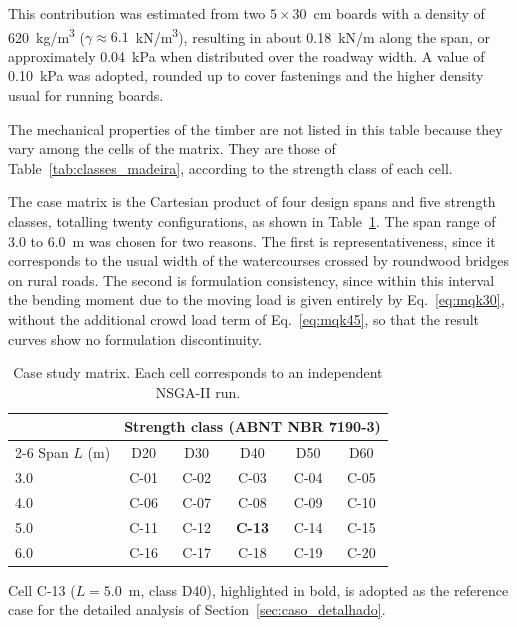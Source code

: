 \begin{table}[!ht]
\begin{threeparttable}
\begin{tablenotes}
This contribution was estimated from two $5 \times 30$~cm boards with a density of 620~kg/m\textsuperscript{3} ($\gamma \approx 6.1$~kN/m\textsuperscript{3}), resulting in about 0.18~kN/m along the span, or approximately 0.04~kPa when distributed over the roadway width.
A value of 0.10~kPa was adopted, rounded up to cover fastenings and the higher density usual for running boards.
\item The mechanical properties of the timber are not listed in this table because they vary among the cells of the matrix. They are those of Table~\ref{tab:classes_madeira}, according to the strength class of each cell.
\end{tablenotes}
\end{threeparttable}
\end{table}

The case matrix is the Cartesian product of four design spans and five strength classes, totalling twenty configurations, as shown in Table~\ref{tab:matriz}.
The span range of 3.0 to 6.0~m was chosen for two reasons.
The first is representativeness, since it corresponds to the usual width of the watercourses crossed by roundwood bridges on rural roads.
The second is formulation consistency, since within this interval the bending moment due to the moving load is given entirely by Eq.~\eqref{eq:mqk30}, without the additional crowd load term of Eq.~\eqref{eq:mqk45}, so that the result curves show no formulation discontinuity.

\begin{table}[!ht]
\caption{Case study matrix. Each cell corresponds to an independent NSGA-II run.\label{tab:matriz}}
\begin{threeparttable}
\begin{tabular*}{\columnwidth}{@{\extracolsep\fill}lccccc@{\extracolsep\fill}}
\toprule
 & \multicolumn{5}{c}{Strength class (ABNT NBR 7190-3)} \\
\cmidrule{2-6}
Span $L$ (m) & D20 & D30 & D40 & D50 & D60 \\
\midrule
3.0 & C-01 & C-02 & C-03 & C-04 & C-05 \\
4.0 & C-06 & C-07 & C-08 & C-09 & C-10 \\
5.0 & C-11 & C-12 & \textbf{C-13} & C-14 & C-15 \\
6.0 & C-16 & C-17 & C-18 & C-19 & C-20 \\
\bottomrule
\end{tabular*}
\begin{tablenotes}
\footnotesize
\item Cell C-13 ($L = 5.0$~m, class D40), highlighted in bold, is adopted as the reference case for the detailed analysis of Section~\ref{sec:caso_detalhado}.
\end{tablenotes}
\end{threeparttable}
\end{table}

